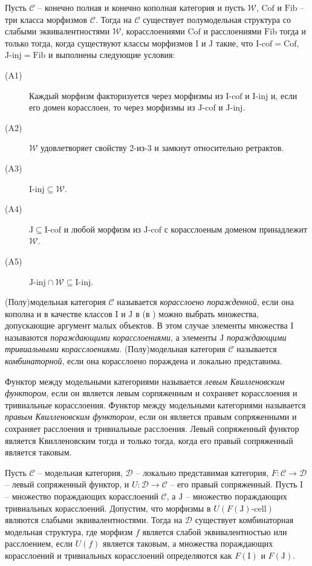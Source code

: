 \documentclass[reqno]{amsart}
\theoremstyle{definition}
\theoremstyle{remark}
\newcommand{\cat}[1]{\mathcal{#1}}
\renewcommand{\C}{\cat{C}}
\newcommand{\D}{\cat{D}}
\newcommand{\we}{\mathcal{W}}
\newcommand{\fib}{\mathrm{Fib}}
\newcommand{\cof}{\mathrm{Cof}}
\newcommand{\I}{\mathrm{I}}
\newcommand{\J}{\mathrm{J}}
\newcommand{\class}[2]{#1\text{-}\mathrm{#2}}
\newcommand{\Iinj}[1][\I]{\class{#1}{inj}}
\newcommand{\Icell}[1][\I]{\class{#1}{cell}}
\newcommand{\Icof}[1][\I]{\class{#1}{cof}}
\newcommand{\Jinj}[1][]{\Iinj[\J#1]}
\newcommand{\Jcof}[1][]{\Icof[\J#1]}
\begin{document}
\begin{prop}
Пусть $\C$ -- конечно полная и конечно кополная категория и пусть $\we$, $\cof$ и $\fib$ -- три класса морфизмов $\C$.
Тогда на $\C$ существует полумодельная структура со слабыми эквивалентностями $\we$, корасслоениями $\cof$ и расслоениями $\fib$ тогда и только тогда,
когда существуют классы морфизмов $\I$ и $\J$ такие, что $\Icof = \cof$, $\Jinj = \fib$ и выполнены следующие условия:
\begin{description}
\item[(A1)] Каждый морфизм факторизуется через морфизмы из $\Icof$ и $\Iinj$ и, если его домен корасслоен, то через морфизмы из $\Jcof$ и $\Jinj$.
\item[(A2)] $\we$ удовлетворяет свойству 2-из-3 и замкнут относительно ретрактов.
\item[(A3)] $\Iinj \subseteq \we$.
\item[(A4)] $\J \subseteq \Icof$ и любой морфизм из $\Jcof$ с корасслоеным доменом принадлежит $\we$.
\item[(A5)] $\Jinj \cap \we \subseteq \Iinj$.
\end{description}
\end{prop}

\begin{defn}
(Полу)модельная категория $\C$ называется \emph{корасслоено поражденной}, если она кополна и в качестве классов $\I$ и $\J$ в  (в ) можно выбрать множества, допускающие аргумент малых объектов.
В этом случае элементы множества $\I$ называются \emph{пораждающими корасслоениями}, а элементы $\J$ \emph{пораждающими тривиальными корасслоениями}.
(Полу)модельная категория $\C$ называется \emph{комбинаторной}, если она корасслоено пораждена и локально представима.
\end{defn}

Функтор между модельными категориями называется \emph{левым Квилленовским функтором}, если он является левым сорпяженным и сохраняет корасслоения и тривиальные корасслоения.
Функтор между модельными категориями называется \emph{правым Квилленовским функтором}, если он является правым сопряженными и сохраняет расслоения и тривиальные расслоения.
Левый сопряженный функтор является Квилленовским тогда и только тогда, когда его правый сопряженный является таковым.

\begin{prop}[transferred]
Пусть $\C$ -- модельная категория, $\D$ -- локально представимая категория, $F : \C \to \D$ -- левый сопряженный функтор, и $U : \D \to \C$ -- его правый сопряженный.
Пусть $\I$ -- множество пораждающих корасслоений $\C$, а $\J$ -- множество пораждающих тривиальных корасслоений.
Допустим, что морфизмы в $U(\Icell[F(\J)])$ являются слабыми эквивалентностями.
Тогда на $\D$ существует комбинаторная модельная структура, где морфизм $f$ является слабой эквивалентностью или расслоением, если $U(f)$ является таковым,
а множества пораждающих корасслоений и тривиальных корасслоений определяются как $F(\I)$ и $F(\J)$.
\end{prop} 
\end{document}
